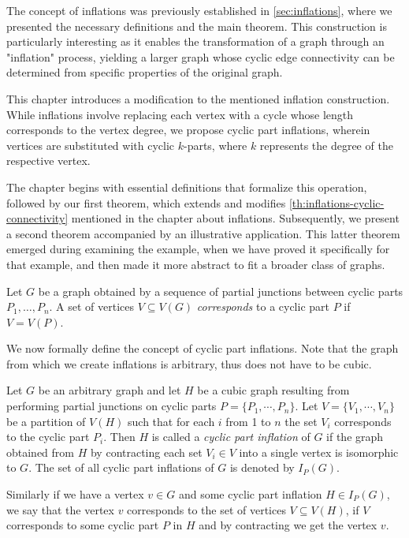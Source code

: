 \documentclass[12pt, twoside]{book}
\begin{document}
The concept of inflations was previously established in \cref{sec:inflations}, where we presented the necessary definitions and the main theorem. This construction is particularly interesting as it enables the transformation of a graph through an "inflation" process, yielding a larger graph whose cyclic edge connectivity can be determined from specific properties of the original graph.

This chapter introduces a modification to the mentioned inflation construction. While inflations involve replacing each vertex with a cycle whose length corresponds to the vertex degree, we propose cyclic part inflations, wherein vertices are substituted with cyclic $k$-parts, where $k$ represents the degree of the respective vertex.

The chapter begins with essential definitions that formalize this operation, followed by our first theorem, which extends and modifies \cref{th:inflations-cyclic-connectivity} mentioned in the chapter about inflations. Subsequently, we present a second theorem accompanied by an illustrative application. This latter theorem emerged during examining the example, when we have proved it specifically for that example, and then made it more abstract to fit a broader class of graphs.

Let $G$ be a graph obtained by a sequence of partial junctions between cyclic parts $P_1,\dots,P_n$. A set of vertices $V\subseteq V(G)$ \textit{corresponds} to a cyclic part $P$ if $V=V(P)$.

We now formally define the concept of cyclic part inflations. Note that the graph from which we create inflations is arbitrary, thus does not have to be cubic.

\begin{definition}
	\label{def:cyclic-part-inflation}
	Let $G$ be an arbitrary graph and let $H$ be a cubic graph resulting from performing partial junctions on cyclic parts $P=\{P_1,\cdots,P_n\}$. Let $V=\{V_1,\cdots, V_n\}$ be a partition of $V(H)$ such that for each $i$ from 1 to $n$ the set $V_i$ corresponds to the cyclic part $P_i$. Then $H$ is called a \textit{cyclic part inflation} of $G$ if the graph obtained from $H$ by contracting each set $V_i\in V$ into a single vertex is isomorphic to $G$. The set of all cyclic part inflations of $G$ is denoted by $I_P(G)$.
\end{definition}

Similarly if we have a vertex $v\in G$ and some cyclic part inflation $H\in I_P(G)$, we say that the vertex $v$ corresponds to the set of vertices $V\subseteq V(H)$, if $V$ corresponds to some cyclic part $P$ in $H$ and by contracting we get the vertex $v$.
\end{document}
